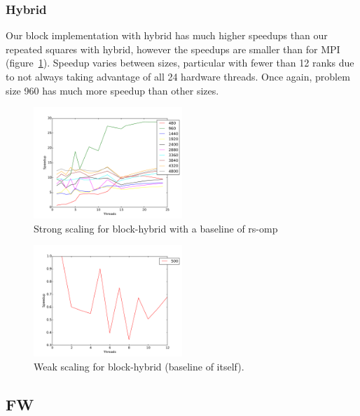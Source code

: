 \subsubsection{Hybrid}

Our block implementation with hybrid has much higher speedups than our repeated squares with hybrid, however the speedups are smaller than for MPI (figure~\ref{strong-block-hybrid}). Speedup varies between sizes, particular with fewer than 12 ranks due to not always taking advantage of all 24 hardware threads. Once again, problem size 960 has much more speedup than other sizes.

\begin{figure}[ht]
\centering
\includegraphics[width=0.5\textwidth]{plots/strong_block-hybrid_baseline-rs-omp--1.pdf}
\caption{Strong scaling for block-hybrid with a baseline of rs-omp}
\label{strong-block-hybrid}
\end{figure}


\begin{figure}[ht]
\centering
\includegraphics[width=0.5\textwidth]{plots/weak_block-hybrid.pdf}
\caption{Weak scaling for block-hybrid (baseline of itself).}
\label{weak-block-hybrid}
\end{figure}

\subsection{FW}

